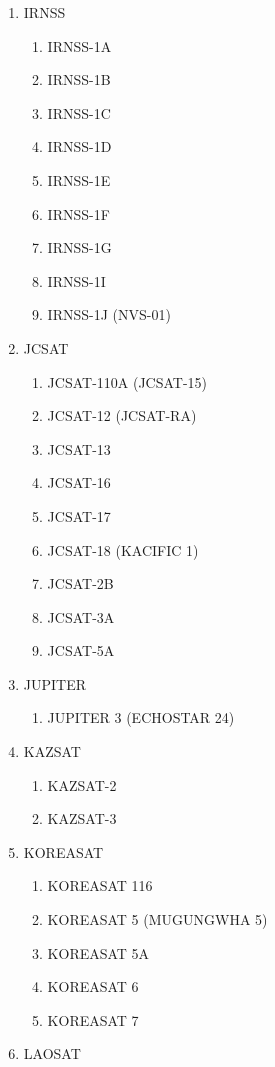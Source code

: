 \begin{multicols}{2}
\begin{enumerate}
  \item IRNSS
  \begin{enumerate}
    \item IRNSS-1A
    \item IRNSS-1B
    \item IRNSS-1C
    \item IRNSS-1D
    \item IRNSS-1E
    \item IRNSS-1F
    \item IRNSS-1G
    \item IRNSS-1I
    \item IRNSS-1J (NVS-01)
  \end{enumerate}
  \item JCSAT
  \begin{enumerate}
    \item JCSAT-110A (JCSAT-15)
    \item JCSAT-12 (JCSAT-RA)
    \item JCSAT-13
    \item JCSAT-16
    \item JCSAT-17
    \item JCSAT-18 (KACIFIC 1)
    \item JCSAT-2B
    \item JCSAT-3A
    \item JCSAT-5A
  \end{enumerate}
  \item JUPITER
  \begin{enumerate}
    \item JUPITER 3 (ECHOSTAR 24)
  \end{enumerate}
  \item KAZSAT
  \begin{enumerate}
    \item KAZSAT-2
    \item KAZSAT-3
  \end{enumerate}
  \item KOREASAT
  \begin{enumerate}
    \item KOREASAT 116
    \item KOREASAT 5 (MUGUNGWHA 5)
    \item KOREASAT 5A
    \item KOREASAT 6
    \item KOREASAT 7
  \end{enumerate}
  \item LAOSAT
  \begin{enumerate}

\end{enumerate}
\end{enumerate}
\end{multicols}
